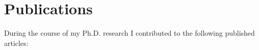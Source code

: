 \appendix
\chapter{Publications}
\label{ch_pubs}

During the course of my Ph.D. research I contributed to the following published articles:

\def\bibpreamble{}

\begin{bibunit}
\nocite{Jordan2008alt}
\nocite{Bishop2009alt}
\nocite{Sipos2011alt}
\nocite{Albers2011alt}
\nocite{LindbladToh2011alt}
\nocite{Jordan2011alt}
\def\chapter*#1{}
\renewcommand{\bibsection}{\chapter*{\bibname}}
\putbib[references]
\end{bibunit}
